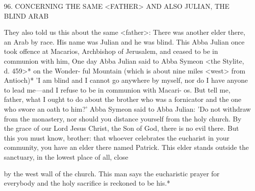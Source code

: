 96. CONCERNING THE SAME <FATHER> AND
ALSO JULIAN, THE BLIND ARAB

They also told us this about the same <father>: There was another
elder there, an Arab by race. His name was Julian and he was blind.
This Abba Julian once took offence at Macarios, Archbishop of
Jerusalem, and ceased to be in communion with him, One day Abba
Julian said to Abba Symeon <the Stylite, d. 459>* on the Wonder-
ful Mountain (which is about nine miles <west> from Antioch)* 'I
am blind and I cannot go anywhere by myself, nor do I have
anyone to lead me—and I refuse to be in communion with Macari-
os. But tell me, father, what I ought to do about the brother who
was a fornicator and the one who swore an oath to him?' Abba
Symeon said to Abba Julian: 'Do not withdraw from the monastery,
nor should you distance yourself from the holy church. By the grace
of our Lord Jesus Christ, the Son of God, there is no evil there. But
this you must know, brother: that whoever celebrates the eucharist
in your community, you have an elder there named Patrick. This
elder stands outside the sanctuary, in the lowest place of all, close

by the west wall of the church. This man says the eucharistic prayer
for everybody and the holy sacrifice is reckoned to be his.*

